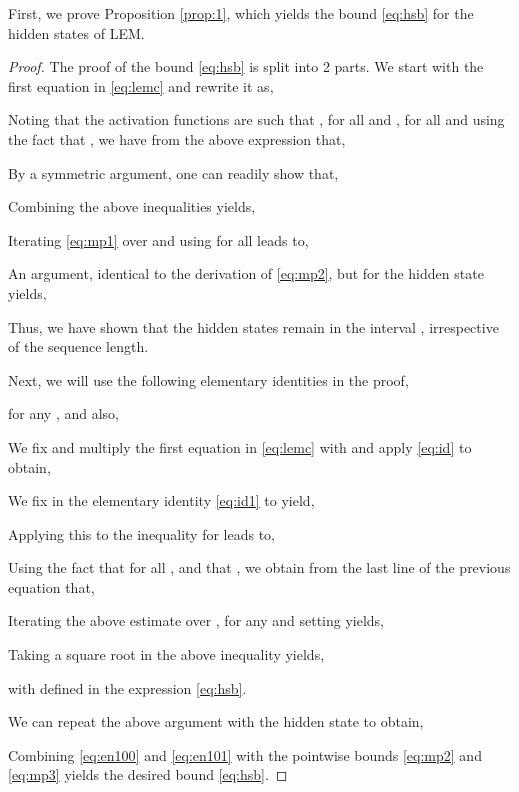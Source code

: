 \documentclass{article} \usepackage{iclr2022_conference,times}
\begin{document}
First, we prove Proposition \ref{prop:1}, which yields the bound \eqref{eq:hsb} for the hidden states of LEM.
\begin{proof}
The proof of the bound \eqref{eq:hsb} is split into 2 parts. We start with the first equation in \eqref{eq:lemc} and rewrite it as,

Noting that the activation functions are such that , for all  and , for all  and using the fact that , we have from the above expression that,

By a symmetric argument, one can readily show that,

Combining the above inequalities yields,

Iterating \eqref{eq:mp1} over  and using  for all  leads to,


An argument, identical to the derivation of \eqref{eq:mp2}, but for the hidden state  yields,

Thus, we have shown that the hidden states remain in the interval , irrespective of the sequence length. 

Next, we will use the following elementary identities in the proof,

for any , and also,


We fix  and multiply the first equation in \eqref{eq:lemc} with  and apply \eqref{eq:id} to obtain,

    
We fix  in the elementary identity \eqref{eq:id1} to yield, 

Applying this to the inequality for  leads to,    
    
    
Using the fact that  for all ,  and that , we obtain from the last line of the previous equation that,

Iterating the above estimate over , for any  and setting  yields,

Taking a square root in the above inequality yields,

with  defined in the expression \eqref{eq:hsb}. 

We can repeat the above argument with the hidden state  to obtain,

Combining \eqref{eq:en100} and \eqref{eq:en101} with the pointwise bounds \eqref{eq:mp2} and \eqref{eq:mp3} yields the desired bound \eqref{eq:hsb}. 
\end{proof}
\end{document}
